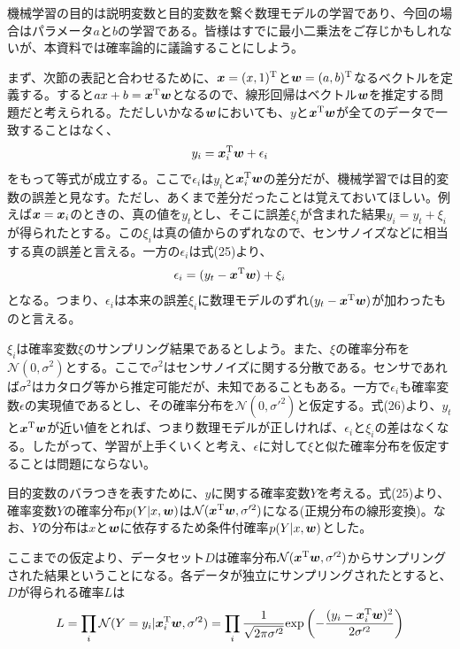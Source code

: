 \documentclass[dvipdfmx, 9pt, a4paper]{jsarticle}
\newcommand{\bm}[1]{{\mbox{\boldmath $#1$}}}
\begin{document}
機械学習の目的は説明変数と目的変数を繋ぐ数理モデルの学習であり、今回の場合はパラメータ$a$と$b$の学習である。皆様はすでに最小二乗法をご存じかもしれないが、本資料では確率論的に議論することにしよう。\par
まず、次節の表記と合わせるために、$\bm x=(x, 1)^{\rm T}$と$\bm w=(a, b)^{\rm T}$なるベクトルを定義する。すると$ax+b=\bm x^{\rm T}\bm w$となるので、線形回帰はベクトル$\bm w$を推定する問題だと考えられる。ただしいかなる$\bm w$においても、$y$と$\bm x^{\rm T}\bm w$が全てのデータで一致することはなく、
\begin{equation}
y_i=\bm x_i^{\rm T} \bm w + \epsilon_i
\end{equation}
をもって等式が成立する。ここで$\epsilon_i$は$y_i$と$\bm x_i^{\rm T} \bm w$の差分だが、機械学習では目的変数の誤差と見なす。ただし、あくまで差分だったことは覚えておいてほしい。例えば$\bm x=\bm x_i$のときの、真の値を$y_t$とし、そこに誤差$\xi_i$が含まれた結果$y_i=y_t+\xi_i$が得られたとする。この$\xi_i$は真の値からのずれなので、センサノイズなどに相当する真の誤差と言える。一方の$\epsilon_i$は式(25)より、
\begin{equation}
\epsilon_i=(y_t-\bm x^{\rm T}\bm w)+\xi_i
\end{equation}
となる。つまり、$\epsilon_i$は本来の誤差$\xi_i$に数理モデルのずれ$(y_t-\bm x^{\rm T}\bm w)$が加わったものと言える。\par
$\xi_i$は確率変数$\xi$のサンプリング結果であるとしよう。また、$\xi$の確率分布を$\mathcal{N}(0, \sigma^2)$とする。ここで$\sigma^2$はセンサノイズに関する分散である。センサであれば$\sigma^2$はカタログ等から推定可能だが、未知であることもある。一方で$\epsilon_i$も確率変数$\epsilon$の実現値であるとし、その確率分布を$\mathcal{N}(0, \sigma'^2)$と仮定する。式(26)より、$y_t$と$\bm x^{\rm T}\bm w$が近い値をとれば、つまり数理モデルが正しければ、$\epsilon_i$と$\xi_i$の差はなくなる。したがって、学習が上手くいくと考え、$\epsilon$に対して$\xi$と似た確率分布を仮定することは問題にならない。\par
目的変数のバラつきを表すために、$y$に関する確率変数$Y$を考える。式(25)より、確率変数$Y$の確率分布$p(Y|x, \bm w)$は$\mathcal{N}(\bm x^{\rm T}\bm w, \sigma'^2)$になる(正規分布の線形変換)。なお、$Y$の分布は$x$と$\bm w$に依存するため条件付確率$p(Y|x, \bm w)$とした。\par
ここまでの仮定より、データセット$D$は確率分布$\mathcal{N}(\bm x^{\rm T}\bm w, \sigma'^2)$からサンプリングされた結果ということになる。各データが独立にサンプリングされたとすると、$D$が得られる確率$L$は
\begin{equation}
L=\prod_i \mathcal{N}(Y=y_i|\bm x_i^{\rm T}\bm w, \sigma'^2)
=\prod_i \frac{1}{\sqrt{2\pi\sigma'^2}}{\rm exp}\left(
-\frac{(y_i-\bm x_i^{\rm T}\bm w)^2}{2\sigma'^2}
\right)
\end{equation}
\end{document}
